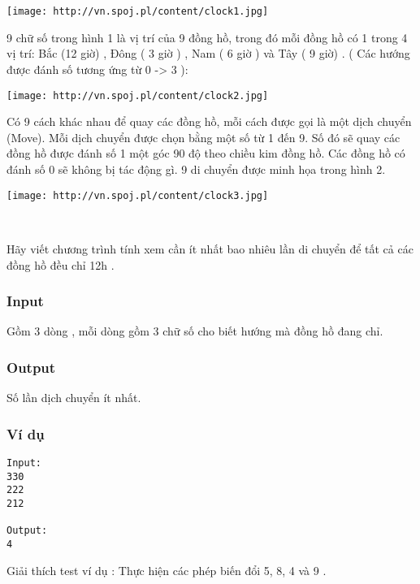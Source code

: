 

 

 


\texttt{[image: http://vn.spoj.pl/content/clock1.jpg]}

9 chữ số trong hình 1 là vị trí của 9 đồng hồ, trong đó mỗi đồng hồ có 1 trong 4 vị trí: Bắc (12 giờ) , Đông ( 3 giờ ) , Nam ( 6 giờ ) và Tây ( 9 giờ) . ( Các hướng được đánh số tương ứng từ 0 -> 3 ):



\texttt{[image: http://vn.spoj.pl/content/clock2.jpg]}


Có 9 cách khác nhau để quay các đồng hồ, mỗi cách được gọi là một dịch chuyển (Move). Mỗi dịch chuyển được chọn bằng một số từ 1 đến 9. Số đó sẽ quay các đồng hồ được đánh số 1 một góc 90 độ theo chiều kim đồng hồ. Các đồng hồ có đánh số 0 sẽ không bị tác động gì. 9 di chuyển được minh họa trong hình 2.


\texttt{[image: http://vn.spoj.pl/content/clock3.jpg]}

 

Hãy viết chương trình tính xem cần ít nhất bao nhiêu lần di chuyển để tất cả các đồng hồ đều chỉ 12h .

\subsubsection{Input}

Gồm 3 dòng , mỗi dòng gồm 3 chữ số cho biết hướng mà đồng hồ đang chỉ.

\subsubsection{Output}

Số lần dịch chuyển ít nhất.

\subsubsection{Ví dụ}
\begin{verbatim}
Input:
330
222
212

Output:
4
\end{verbatim}

Giải thích test ví dụ : Thực hiện các phép biến đổi 5, 8, 4 và 9 .
